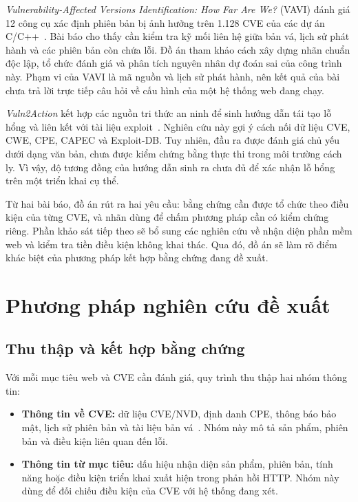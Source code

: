 \documentclass[11pt,a4paper]{article}
\begin{document}
\emph{Vulnerability-Affected Versions Identification: How Far Are We?} (VAVI) đánh giá 12 công cụ xác định phiên bản bị ảnh hưởng trên 1.128 CVE của các dự án C/C++~\cite{vavi}. Bài báo cho thấy cần kiểm tra kỹ mối liên hệ giữa bản vá, lịch sử phát hành và các phiên bản còn chứa lỗi. Đồ án tham khảo cách xây dựng nhãn chuẩn độc lập, tổ chức đánh giá và phân tích nguyên nhân dự đoán sai của công trình này. Phạm vi của VAVI là mã nguồn và lịch sử phát hành, nên kết quả của bài chưa trả lời trực tiếp câu hỏi về cấu hình của một hệ thống web đang chạy.

\emph{Vuln2Action} kết hợp các nguồn tri thức an ninh để sinh hướng dẫn tái tạo lỗ hổng và liên kết với tài liệu exploit~\cite{vuln2action}. Nghiên cứu này gợi ý cách nối dữ liệu CVE, CWE, CPE, CAPEC và Exploit-DB. Tuy nhiên, đầu ra được đánh giá chủ yếu dưới dạng văn bản, chưa được kiểm chứng bằng thực thi trong môi trường cách ly. Vì vậy, độ tương đồng của hướng dẫn sinh ra chưa đủ để xác nhận lỗ hổng trên một triển khai cụ thể.

Từ hai bài báo, đồ án rút ra hai yêu cầu: bằng chứng cần được tổ chức theo điều kiện của từng CVE, và nhãn dùng để chấm phương pháp cần có kiểm chứng riêng. Phần khảo sát tiếp theo sẽ bổ sung các nghiên cứu về nhận diện phần mềm web và kiểm tra tiền điều kiện không khai thác. Qua đó, đồ án sẽ làm rõ điểm khác biệt của phương pháp kết hợp bằng chứng đang đề xuất.

\section{Phương pháp nghiên cứu đề xuất}

\subsection{Thu thập và kết hợp bằng chứng}

Với mỗi mục tiêu web và CVE cần đánh giá, quy trình thu thập hai nhóm thông tin:
\begin{itemize}
  \item \textbf{Thông tin về CVE:} dữ liệu CVE/NVD, định danh CPE, thông báo bảo mật, lịch sử phiên bản và tài liệu bản vá~\cite{cve,nvd,cpe}. Nhóm này mô tả sản phẩm, phiên bản và điều kiện liên quan đến lỗi.
  \item \textbf{Thông tin từ mục tiêu:} dấu hiệu nhận diện sản phẩm, phiên bản, tính năng hoặc điều kiện triển khai xuất hiện trong phản hồi HTTP. Nhóm này dùng để đối chiếu điều kiện của CVE với hệ thống đang xét.
\end{itemize}
\end{document}
